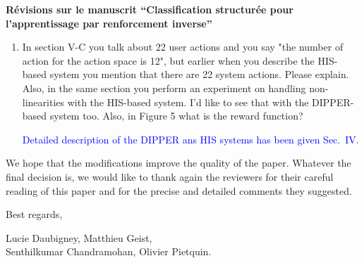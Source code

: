 \documentclass[11pt, a4paper]{letter}
\begin{document}
\begin{letter}{\large \textbf{Révisions sur le manuscrit ``Classification structurée pour l'apprentissage par renforcement inverse''}}
\begin{enumerate}
 What is the reward function? Figure 4 has the same problems as Figure 2. For on-policy learning for the graphs you use a sliding windows. Do you use that for the off-policy graphs too?

\textcolor{blue}{A sliding window is only used for the controlled
approaches (Fig.~3,4,6,7,8). It has been precised in the article
when a sliding window is used. }


\item  In section V-C you talk about 22 user actions and you say "the number of
 action for the action space is 12", but earlier when you describe the
 HIS-based system you mention
 that there are 22 system actions. Please explain.
Also, in the same section you perform an experiment on handling non-linearities with the HIS-based
 system. I'd like to see that with the DIPPER-based system too.
Also, in Figure 5 what is the reward function?

\textcolor{blue}{Detailed description of the DIPPER ans HIS systems
has been given Sec.~IV.}

\end{enumerate}


\color{blue} We hope that the modifications improve the quality of
the paper. Whatever the final decision is, we would like to thank
again the reviewers for their careful reading of this paper and for
the precise and detailed comments they suggested.

Best regards,

\begin{flushright}
Lucie Daubigney, Matthieu Geist, \\ Senthilkumar Chandramohan, Olivier Pietquin.
\end{flushright}


\end{letter}
\end{document}
